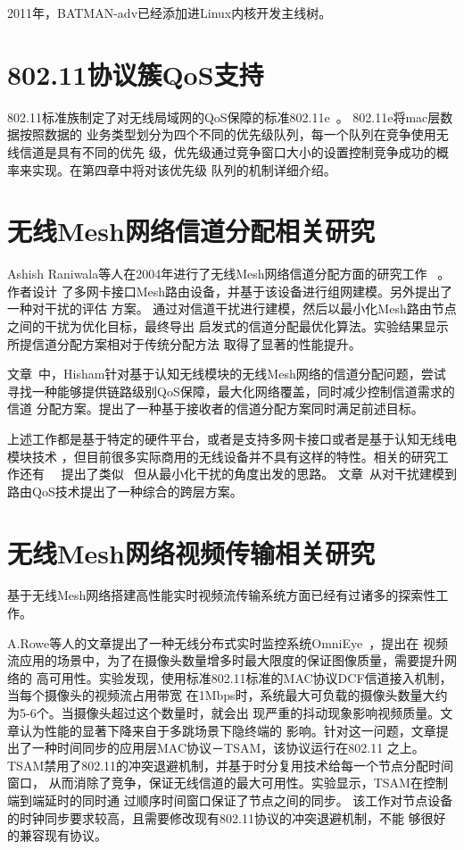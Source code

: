2011年，BATMAN-adv已经添加进Linux内核开发主线树。

\section{802.11协议簇QoS支持}
802.11标准族制定了对无线局域网的QoS保障的标准802.11e~\cite{IEEE80211e}。
802.11e将mac层数据按照数据的
业务类型划分为四个不同的优先级队列，每一个队列在竞争使用无线信道是具有不同的优先
级，优先级通过竞争窗口大小的设置控制竞争成功的概率来实现。在第四章中将对该优先级
队列的机制详细介绍。

\section{无线Mesh网络信道分配相关研究}
Ashish Raniwala等人在2004年进行了无线Mesh网络信道分配方面的研究工作
~\cite{multichannelassignment}。作者设计
了多网卡接口Mesh路由设备，并基于该设备进行组网建模。另外提出了一种对干扰的评估
方案。
通过对信道干扰进行建模，然后以最小化Mesh路由节点之间的干扰为优化目标，最终导出
启发式的信道分配最优化算法。实验结果显示所提信道分配方案相对于传统分配方法
取得了显著的性能提升。

文章~\cite{RBA}中，Hisham针对基于认知无线模块的无线Mesh网络的信道分配问题，尝试
寻找一种能够提供链路级别QoS保障，最大化网络覆盖，同时减少控制信道需求的信道
分配方案。提出了一种基于接收者的信道分配方案同时满足前述目标。

上述工作都是基于特定的硬件平台，或者是支持多网卡接口或者是基于认知无线电模块技术
，但目前很多实际商用的无线设备并不具有这样的特性。相关的研究工作还有~\cite{2008minimum}
~\cite{2005characterizing}提出了类似~\cite{multichannelassignment}
但从最小化干扰的角度出发的思路。
文章~\cite{2005interference}从对干扰建模到路由QoS技术提出了一种综合的跨层方案。

\section{无线Mesh网络视频传输相关研究}
基于无线Mesh网络搭建高性能实时视频流传输系统方面已经有过诸多的探索性工作。

A.Rowe等人的文章提出了一种无线分布式实时监控系统OmniEye~\cite{OmniEye}，提出在
视频流应用的场景中，为了在摄像头数量增多时最大限度的保证图像质量，需要提升网络的
高可用性。实验发现，使用标准802.11标准的MAC协议DCF信道接入机制，
当每个摄像头的视频流占用带宽
在1Mbps时，系统最大可负载的摄像头数量大约为5-6个。当摄像头超过这个数量时，就会出
现严重的抖动现象影响视频质量。文章认为性能的显著下降来自于多跳场景下隐终端的
影响。针对这一问题，文章提出了一种时间同步的应用层MAC协议－TSAM，该协议运行在802.11
之上。TSAM禁用了802.11的冲突退避机制，并基于时分复用技术给每一个节点分配时间窗口，
从而消除了竞争，保证无线信道的最大可用性。实验显示，TSAM在控制端到端延时的同时通
过顺序时间窗口保证了节点之间的同步。
该工作对节点设备的时钟同步要求较高，且需要修改现有802.11协议的冲突退避机制，不能
够很好的兼容现有协议。

